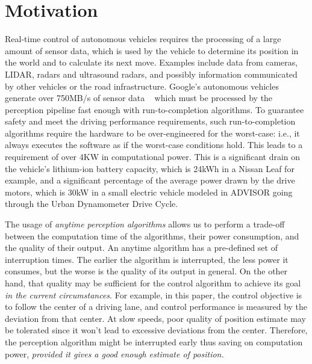 \section{Motivation}
\label{sec:motivation}
Real-time control of autonomous vehicles requires the processing of a large amount of sensor data, which is used by the vehicle to determine its position in the world and to calculate its next move.
Examples include data from cameras, LIDAR, radars and ultrasound radars, and possibly information communicated by other vehicles or the road infrastructure.
Google's autonomous vehicles generate over 750MB/s of sensor data ~\cite{diamandis2015bold} which must be processed by the perception pipeline fast enough with run-to-completion algorithms. 
To guarantee safety and meet the driving performance requirements, such run-to-completion algorithms require the hardware to be over-engineered for the worst-case: i.e., it always executes the software as if the worst-case conditions hold.
This leads to a requirement of over 4KW in computational power. 
This is a significant drain on the vehicle's lithium-ion battery capacity, which is 24kWh in a Nissan Leaf for example, and a significant percentage of the average power drawn by the drive motors, which is 30kW in a small electric vehicle modeled in ADVISOR \cite{nreladvisor} going through the Urban Dynamometer Drive Cycle.

The usage of \emph{anytime perception algorithms} allows us to perform a trade-off between the computation time of the algorithms, their power consumption, and the quality of their output.
An anytime algorithm has a pre-defined set of interruption times. 
The earlier the algorithm is interrupted, the less power it consumes, but the worse is the quality of its output in general. 
On the other hand, that quality may be sufficient for the control algorithm to achieve its goal \emph{in the current circumstances}.
For example, in this paper, the control objective is to follow the center of a driving lane, and control performance is measured by the deviation from that center.
At slow speeds, poor quality of position estimate may be tolerated since it won't lead to excessive deviations from the center.
Therefore, the perception algorithm might be interrupted early thus saving on computation power, \emph{provided it gives a good enough estimate of position. }

